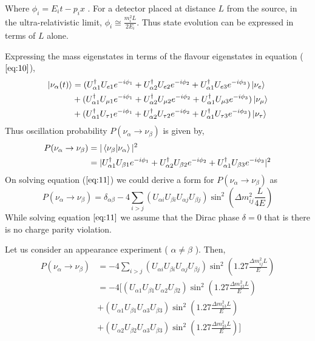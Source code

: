 \documentclass[12pt,a4paper]{report}
\begin{document}
Where $\phi_{i} = E_{i}t - p_{i}x$ . For a detector placed at distance $L$ from the source, in the ultra-relativistic limit, $\phi_{i} \cong \frac{m_{i}^{2}L}{2E_{i}} $. Thus state evolution can be expressed in terms of $L$ alone. \par
Expressing the mass eigenstates in terms of the flavour eigenstates in equation ($\ref{eq:10}$),
\begin{equation}
\begin{split}
\ket{\nu_{\alpha}(t)}&=(U_{\alpha 1}^{\dagger}U_{e1}e^{-i\phi_{1}}+U_{\alpha 2}^{\dagger}U_{e2}e^{-i\phi_{2}}+U_{\alpha 1}^{\dagger}U_{e3}e^{-i\phi_{3}})\ket{\nu_{e}}\\
&+(U_{\alpha 1}^{\dagger}U_{\mu 1}e^{-i\phi_{1}}+U_{\alpha 2}^{\dagger}U_{\mu 2}e^{-i\phi_{2}}+U_{\alpha 1}^{\dagger}U_{\mu 3}e^{-i\phi_{3}})\ket{\nu_{\mu}}\\
&+(U_{\alpha 1}^{\dagger}U_{\tau 1}e^{-i\phi_{1}}+U_{\alpha 2}^{\dagger}U_{\tau 2}e^{-i\phi_{2}}+U_{\alpha 1}^{\dagger}U_{\tau 3}e^{-i\phi_{3}})\ket{\nu_{\tau}}
\end{split}
\end{equation}
Thus oscillation probability $P(\nu_{\alpha} \rightarrow \nu_{\beta})$ is given by,
\begin{equation}
\label{eq:11}
\begin{split}
P(\nu_{\alpha} \rightarrow \nu_{\beta})& = |\braket{\nu_{\beta}|\nu_{\alpha}}|^{2}\\
&=|U_{\alpha 1}^{\dagger}U_{\beta 1}e^{-i\phi_{1}}+U_{\alpha 2}^{\dagger}U_{\beta 2}e^{-i\phi_{2}}+U_{\alpha 1}^{\dagger}U_{\beta 3}e^{-i\phi_{3}}|^{2}
\end{split}
\end{equation}
On solving equation ($\ref{eq:11}$) we could derive a form for $P(\nu_{\alpha} \rightarrow \nu_{\beta})$ as
\begin{equation}
\label{eq:12}
P(\nu_{\alpha} \rightarrow \nu_{\beta}) = \delta_{\alpha\beta} - 4\sum_{i>j}(U_{\alpha i}U_{\beta i}U_{\alpha j}U_{\beta j}) \sin^{2}(\Delta m_{ij}^{2} \frac{L}{4E})
\end{equation} 
While solving equation $\ref{eq:11}$  we assume that the Dirac phase $\delta = 0$ that is there is no charge parity violation. \par
Let us consider an appearance experiment ( $\alpha \neq \beta$ ). Then, 
\begin{equation}
\label{eq:13}
\begin{split}
P(\nu_{\alpha} \rightarrow \nu_{\beta} )& = -4\sum_{i>j} ( U_{\alpha i} U_{\beta i} U_{\alpha j} U_{\beta j}) \sin^{2}(1.27\frac{\Delta m_{ij}^{2}  L}{E})\\
&=-4[(U_{\alpha 1} U_{\beta 1} U_{\alpha 2} U_{\beta 2})\sin^{2}(1.27\frac{\Delta m_{12}^{2} L}{E})\\
&+( U_{\alpha 1} U_{\beta 1} U_{\alpha 3} U_{\beta 3})\sin^{2}(1.27\frac{\Delta m_{13}^{2} L}{E})\\
&+( U_{\alpha 2} U_{\beta 2} U_{\alpha 3} U_{\beta 3})\sin^{2}(1.27\frac{\Delta m_{23}^{2} L}{E})]
\end{split}
\end{equation}
\end{document}
